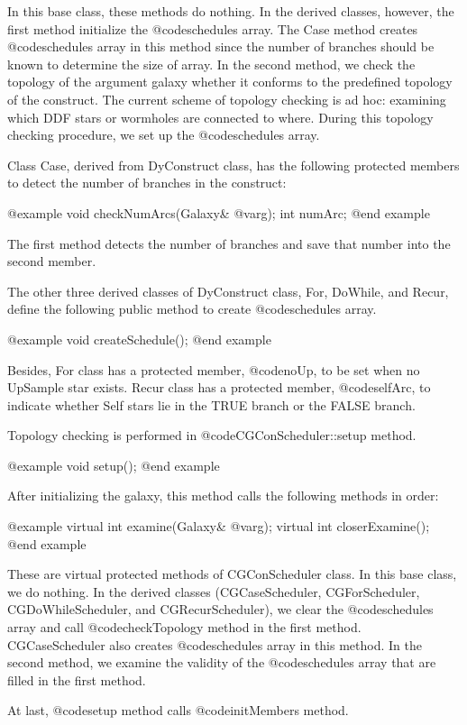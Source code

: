 {In this base class, these methods do nothing. In the derived classes, however,
the first method initialize the @code{schedules} array. The Case method
creates @code{schedules} array in this method since the number of 
branches should be known to determine the size of array.
In the second method, we check the topology of the argument galaxy whether
it conforms to the predefined topology of the construct. The current
scheme of topology checking is ad hoc: examining which DDF stars or
wormholes are connected to where. During this topology checking procedure,
we set up the @code{schedules} array.

Class Case, derived from DyConstruct class, has the following protected
members to detect the number of branches in the construct:

@example
void checkNumArcs(Galaxy& @var{g});
int numArc;
@end example

The first method detects the number of branches and save that number into
the second member.

The other three derived classes of DyConstruct class, For, DoWhile, and Recur,
define the following public method to create @code{schedules} array.

@example
void createSchedule();
@end example

Besides, For class has a protected member, @code{noUp}, to be set when
no UpSample star exists. Recur class has a protected member, @code{selfArc},
to indicate whether Self stars lie in the TRUE branch or the FALSE branch.

Topology checking is performed in @code{CGConScheduler::setup} method.

@example
void setup();
@end example

After initializing the galaxy, this method calls the following methods
in order:

@example
virtual int examine(Galaxy& @var{g});
virtual int closerExamine();
@end example

These are virtual protected methods of CGConScheduler class.
In this base class, we do nothing. In the derived classes (CGCaseScheduler,
CGForScheduler, CGDoWhileScheduler, and CGRecurScheduler), we clear the
@code{schedules} array and call @code{checkTopology} method in the first
method. CGCaseScheduler also creates @code{schedules} array in this method.
In the second method, we examine the validity of the
@code{schedules} array that are filled in the first method.

At last, @code{setup} method calls @code{initMembers} method.

}
